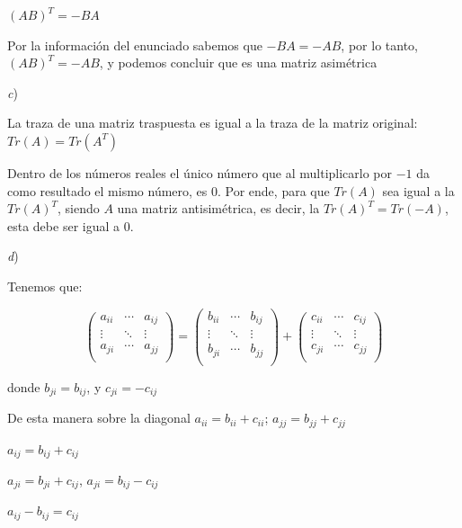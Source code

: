 \documentclass[11pt,a4paper]{article}
\begin{document}
\begin{enumerate}
\begin{center}
    $(AB)^{T}= -BA$
\end{center}

Por la información del enunciado sabemos que $-BA = -AB$, por lo tanto, $(AB)^{T}=-AB$, y podemos concluir que es una matriz asimétrica

\vspace{0.5cm}

\textit{c}) 

La traza de una matriz traspuesta es igual a la traza de la matriz original: $Tr(A)= Tr(A^{T})$

Dentro de los números reales el único número que al multiplicarlo por $-1$ da como resultado el mismo número, es $0$. Por ende, para que  $Tr(A)$ sea igual a la $Tr(A)^{T}$, siendo $A$ una matriz antisimétrica, es decir, la $Tr(A)^{T} = Tr(-A)$, esta debe ser igual a $0$. 

\vspace{0.5cm}

\textit{d}) 

Tenemos que:

$$
\begin{pmatrix} 
a_{ii} & \cdots & a_{ij} \\
\vdots & \ddots & \vdots \\
a_{ji}  & \cdots & a_{jj}\\
\end{pmatrix}
=
\begin{pmatrix} 
b_{ii} & \cdots & b_{ij} \\
\vdots & \ddots & \vdots \\
b_{ji}  & \cdots & b_{jj}\\
\end{pmatrix}
+
\begin{pmatrix} 
c_{ii} & \cdots & c_{ij} \\
\vdots & \ddots & \vdots \\
c_{ji}  & \cdots & c_{jj}\\
\end{pmatrix}
$$

donde $b_{ji} = b_{ij}$, y $c_{ji} = -c_{ij}$

De esta manera sobre la diagonal $a_{ii} = b_{ii} + c_{ii}$; $a_{jj} = b_{jj} + c_{jj}$ 

\begin{center}
    $a_{ij} = b_{ij} + c_{ij}$
    
    $a_{ji} = b_{ji} + c_{ij}$, $a_{ji} = b_{ij} - c_{ij}$
    
    $a_{ij} - b_{ij} = c_{ij}$
    

\end{center}
\end{enumerate}
\end{document}
